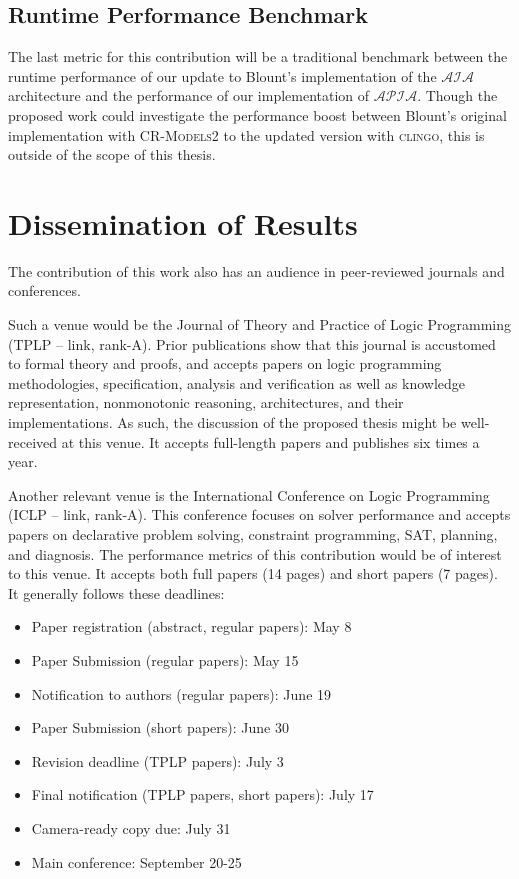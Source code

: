 \subsection{Runtime Performance Benchmark}

The last metric for this contribution will be a traditional benchmark between the runtime performance of our update to Blount's implementation of the $\mathcal{AIA}$ architecture and the performance of our implementation of $\mathcal{APIA}$.
Though the proposed work could investigate the performance boost between Blount's original implementation with \textsc{CR-Models2} to the updated version with \textsc{clingo}, this is outside of the scope of this thesis.

\section{Dissemination of Results}

The contribution of this work also has an audience in peer-reviewed journals and conferences.

Such a venue would be the Journal of Theory and Practice of Logic Programming (TPLP -- link, rank-A).
Prior publications show that this journal is accustomed to formal theory and proofs, and accepts papers on logic programming methodologies, specification, analysis and verification as well as knowledge representation, nonmonotonic reasoning, architectures, and their implementations.
As such, the discussion of the proposed thesis might be well-received at this venue.
It accepts full-length papers and publishes six times a year.

Another relevant venue is the International Conference on Logic Programming (ICLP -- link, rank-A).
This conference focuses on solver performance and accepts papers on declarative problem solving, constraint programming, SAT, planning, and diagnosis.
The performance metrics of this contribution would be of interest to this venue.
It accepts both full papers (14 pages) and short papers (7 pages).
It generally follows these deadlines:

\begin{itemize}
    \item Paper registration (abstract, regular papers): May 8
    \item Paper Submission (regular papers): May 15
    \item Notification to authors (regular papers): June 19
    \item Paper Submission (short papers): June 30
    \item Revision deadline (TPLP papers): July 3
    \item Final notification (TPLP papers, short papers): July 17
    \item Camera-ready copy due: July 31
    \item Main conference: September 20-25
\end{itemize}

